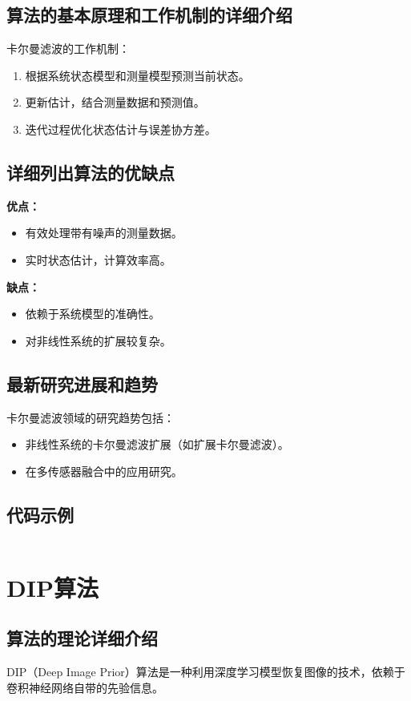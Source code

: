 \subsection*{算法的基本原理和工作机制的详细介绍}
卡尔曼滤波的工作机制：
\begin{enumerate}
    \item 根据系统状态模型和测量模型预测当前状态。
    \item 更新估计，结合测量数据和预测值。
    \item 迭代过程优化状态估计与误差协方差。
\end{enumerate}

\subsection*{详细列出算法的优缺点}
\textbf{优点：}
\begin{itemize}
    \item 有效处理带有噪声的测量数据。
    \item 实时状态估计，计算效率高。
\end{itemize}

\textbf{缺点：}
\begin{itemize}
    \item 依赖于系统模型的准确性。
    \item 对非线性系统的扩展较复杂。
\end{itemize}

\subsection*{最新研究进展和趋势}
卡尔曼滤波领域的研究趋势包括：
\begin{itemize}
    \item 非线性系统的卡尔曼滤波扩展（如扩展卡尔曼滤波）。
    \item 在多传感器融合中的应用研究。
\end{itemize}
\subsection*{代码示例}
\begin{lstlisting}

\end{lstlisting}


\section{DIP算法}
\subsection*{算法的理论详细介绍}
DIP（Deep Image Prior）算法是一种利用深度学习模型恢复图像的技术，依赖于卷积神经网络自带的先验信息。

